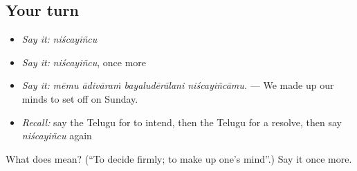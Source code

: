 \subsection*{Your turn}
\begin{itemize}
\raggedright
  \item \emph{Say it:} \emph{niścayiñcu}
  \item \emph{Say it:} \emph{niścayiñcu}, once more
  \item \emph{Say it:} \emph{mēmu ādivāraṁ bayaludērālani niścayiñcāmu.} — We made up our minds to set off on Sunday.
  \item \emph{Recall:} say the Telugu for to intend, then the Telugu for a resolve, then say \emph{niścayiñcu} again
\end{itemize}

\begin{tcolorbox}[breakable,colback=teal!4,colframe=teal!35!black,title={Before you move on}]
What does  mean? (\textquotedblleft{}To decide firmly; to make up one’s mind\textquotedblright{}.) Say it once more.
\end{tcolorbox}
